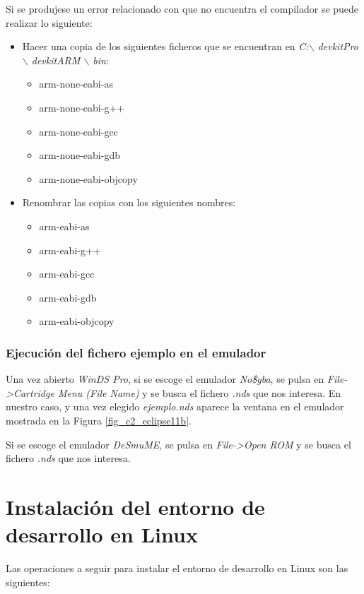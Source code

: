 Si se produjese un error relacionado con que no encuentra el compilador se puede realizar lo siguiente:
\begin{itemize}
\item Hacer una copia de los siguientes ficheros que se encuentran en \textit{C:$\backslash$ devkitPro $\backslash$ devkitARM $\backslash$ bin}:	
	\begin{itemize}
	 	\item arm-none-eabi-as
	 	\item arm-none-eabi-g++
	 	\item arm-none-eabi-gcc	
	 	\item arm-none-eabi-gdb
	   \item arm-none-eabi-objcopy
	\end{itemize}
\item Renombrar las copias con los siguientes nombres:	
	\begin{itemize}
	 	\item arm-eabi-as
	 	\item arm-eabi-g++
	 	\item arm-eabi-gcc	
	 	\item arm-eabi-gdb
	   \item arm-eabi-objcopy
	 \end{itemize}
\end{itemize}


\subsubsection{Ejecución del fichero ejemplo en el emulador}
Una vez abierto \textit{WinDS Pro}, si se escoge el emulador \textit{No\$gba}, se pulsa en \textit{File->Cartridge Menu (File Name)} y se busca el fichero \textit{.nds} que nos interesa. En nuestro caso, y una vez elegido \textit{ejemplo.nds} aparece la ventana en el emulador mostrada en la Figura \ref{fig_c2_eclipse11b}.

Si se escoge el emulador \textit{DeSmuME}, se pulsa en \textit{File->Open ROM} y se busca el fichero \textit{.nds} que nos interesa.

\section{Instalación del entorno de desarrollo en Linux}
Las operaciones a seguir para instalar el entorno de desarrollo en Linux son las siguientes:

